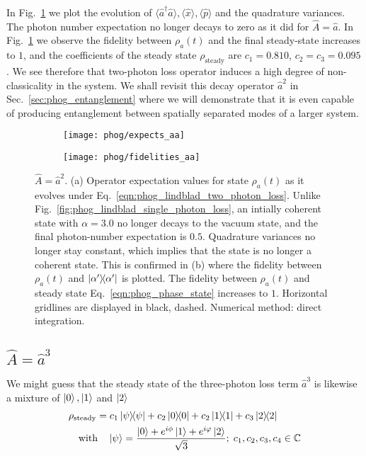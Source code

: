 In Fig.~\ref{fig:phog_lindblad_two_photon_loss} we plot the evolution of $\langle \hat{a}^\dagger \hat{a}\rangle, \langle \hat{x}\rangle, \langle \hat{p}\rangle$ and the quadrature variances. The photon number expectation no longer decays to zero as it did for $\hat{A}=\hat{a}$. %
 In Fig.~\ref{fig:phog_lindblad_two_photon_loss} we observe the fidelity between $\rho_a\left(t\right)$ and the final steady-state increases to $1$, and the coefficients of the steady state $\rho_{\text{steady}}$ are $c_1 = 0.810$, $c_2 = c_3 = 0.095$. We see therefore that two-photon loss operator induces a high degree of non-classicality in the system. We shall revisit this decay operator $\hat{a}^2$ in Sec.~\ref{sec:phog_entanglement} where we will demonstrate that it is even capable of producing entanglement between spatially separated modes of a larger system.


\begin{figure}[htp]
\captionsetup{width=\linewidth}
\centering
	\begin{subfigure}{0.7\linewidth}
	\centering
	\caption{}
	\texttt{[image: phog/expects\_aa]}
	\end{subfigure}
	\begin{subfigure}{0.7\linewidth}
	\centering
	\caption{}
	\texttt{[image: phog/fidelities\_aa]}
	\end{subfigure}
\caption{\label{fig:phog_lindblad_two_photon_loss}$\hat{A} = \hat{a}^2$. (a) Operator expectation values for state $\rho_a\left(t\right)$ as it evolves under Eq.~\ref{eqn:phog_lindblad_two_photon_loss}. Unlike Fig.~\ref{fig:phog_lindblad_single_photon_loss}, an intially coherent state with $\alpha=3.0$ no longer decays to the vacuum state, and the final photon-number expectation is $0.5$. Quadrature variances no longer stay constant, which implies that the state is no longer a coherent state. This is confirmed in (b) where the fidelity between $\rho_a\left(t\right)$ and $\dyad{\alpha^\prime}$ is plotted. The fidelity between $\rho_a\left(t\right)$ and steady state Eq.~\ref{eqn:phog_phase_state} increases to $1$. Horizontal gridlines are displayed in black, dashed. Numerical method: direct integration.} %
\end{figure}

\iffalse
\clearpage
\subsection{$\hat{A} = \hat{a}^3$}\label{sec:A_aaa}
We might guess that the steady state of the three-photon loss term $\hat{a}^3$ is likewise a mixture of $\ket{0}, \ket{1}$ and $\ket{2}$
\begin{align}\label{eqn:phog_three_photon_loss_ss}
&\rho_{\text{steady}} = c_1 \dyad{\psi} + c_2 \dyad{0} + c_2 \dyad{1} + c_3 \dyad{2} \notag \\
%
&\qq{with} \ket{\psi} = \frac{\ket{0} + e^{i \phi}\ket{1} + e^{i \varphi}\ket{2}}{\sqrt{3}}; \; c_1, c_2, c_3, c_4 \in \mathbb{C}
\end{align}

